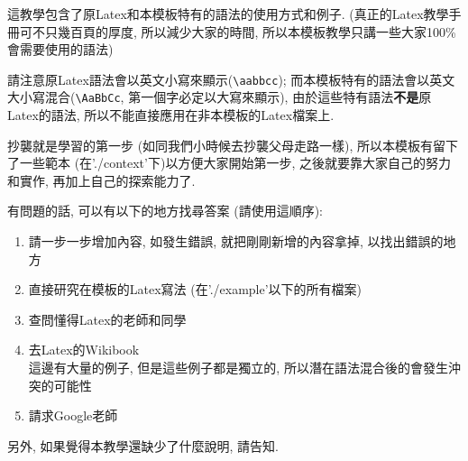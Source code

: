 
%

這教學包含了原Latex和本模板特有的語法的使用方式和例子. (真正的Latex教學手冊可不只幾百頁的厚度, 所以減少大家的時間, 所以本模板教學只講一些大家100\%會需要使用的語法)

請注意原Latex語法會以英文小寫來顯示(\verb|\aabbcc|); 而本模板特有的語法會以英文大小寫混合(\verb|\AaBbCc|, 第一個字必定以大寫來顯示), 由於這些特有語法\textbf{不是}原Latex的語法, 所以不能直接應用在非本模板的Latex檔案上.

抄襲就是學習的第一步 (如同我們小時候去抄襲父母走路一樣), 所以本模板有留下了一些範本 (在'./context'下)以方便大家開始第一步, 之後就要靠大家自己的努力和實作, 再加上自己的探索能力了.

有問題的話, 可以有以下的地方找尋答案 (請使用這順序):
\begin{enumerate}
  \item 請一步一步增加內容, 如發生錯誤, 就把剛剛新增的內容拿掉, 以找出錯誤的地方
  \item 直接研究在模板的Latex寫法 (在'./example'以下的所有檔案)
  \item 查問懂得Latex的老師和同學 %
  \item 去Latex的Wikibook\\
        這邊有大量的例子, 但是這些例子都是獨立的, 所以潛在語法混合後的會發生沖突的可能性
  \item 請求Google老師 %
\end{enumerate}

另外, 如果覺得本教學還缺少了什麼說明, 請告知.

